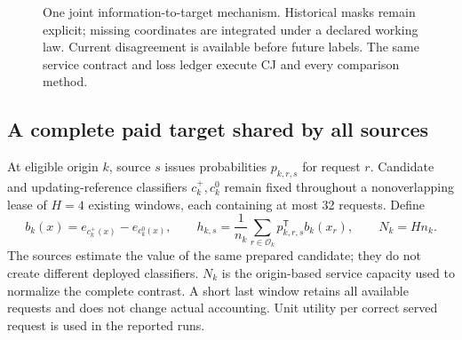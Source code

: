 \documentclass[10pt]{article}
\begin{document}
\begin{figure}[t]
\centering
{}
\caption{One joint information-to-target mechanism. Historical masks remain
explicit; missing coordinates are integrated under a declared working law.
Current disagreement is available before future labels. The same service
contract and loss ledger execute CJ and every comparison method.}
\label{fig:conditional-overview}
\end{figure}

\subsection{A complete paid target shared by all sources}
At eligible origin $k$, source $s$ issues probabilities $p_{k,r,s}$ for
request $r$. Candidate and updating-reference classifiers $c_k^+,c_k^0$
remain fixed throughout a nonoverlapping lease of $H=4$ existing windows,
each containing at most 32 requests. Define
\begin{equation}
 b_k(x)=e_{c_k^+(x)}-e_{c_k^0(x)},\qquad
 h_{k,s}=\frac1{n_k}\sum_{r\in\mathcal O_k}
 p_{k,r,s}^{\mathsf T}b_k(x_r),\qquad N_k=Hn_k.
 \label{eq:current-contrast}
\end{equation}
The sources estimate the value of the same prepared candidate; they do not
create different deployed classifiers. $N_k$ is the origin-based service
capacity used to normalize the complete contrast. A short last window
retains all available requests and does not change actual accounting.
Unit utility per correct served request is used in the reported runs.
\end{document}
